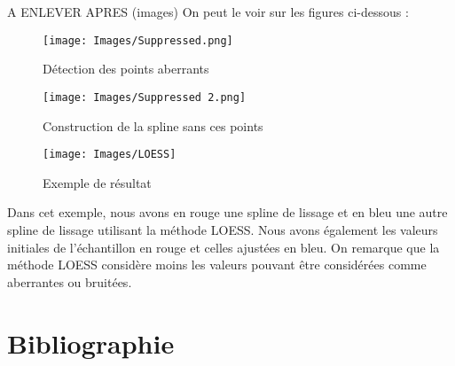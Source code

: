 \documentclass[a4paper,12pt]{article} %
\begin{document}
	
	
	
	A ENLEVER APRES (images)
	On peut le voir sur les figures ci-dessous :
    			        
    			         \begin{figure}[H]
                            \centering
                            \texttt{[image: Images/Suppressed.png]}
                            \caption{Détection des points aberrants}
                            \label{fig:exemple}
                        \end{figure}
                        
                        
                         \begin{figure}[H]
                            \centering
                            \texttt{[image: Images/Suppressed 2.png]}
                            \caption{Construction de la spline sans ces points}
                            \label{fig:exemple}
                        \end{figure}
                        
\begin{figure}[H]
                        \centering
                        \texttt{[image: Images/LOESS]}
                        \caption{Exemple de résultat }
                        \label{fig:exemple}
                    \end{figure}
                    
                    Dans cet exemple, nous avons en rouge une spline de lissage et en bleu une autre spline de lissage utilisant la méthode LOESS.  Nous avons également les valeurs initiales de l'échantillon en rouge et celles ajustées en bleu. On remarque que la méthode LOESS considère moins les valeurs pouvant être considérées comme aberrantes ou bruitées.
                        
                        

\cite{CAO_site}
\cite{CAO_lissage}
\cite{RANSAC}
\cite{Param_lissage}
\cite{LOESS1}
\cite{LOESS2}
\cite{Detection}
\cite{DES}
\cite{Grubbs1}
\cite{Grubbs2}
\cite{MC}
\cite{Win1}
\cite{Win2}
\cite{KNN1}
\cite{KNN2}
\cite{KNN3}




\renewcommand\partname{}
\part{Bibliographie}

\printbibliography
\end{document}
